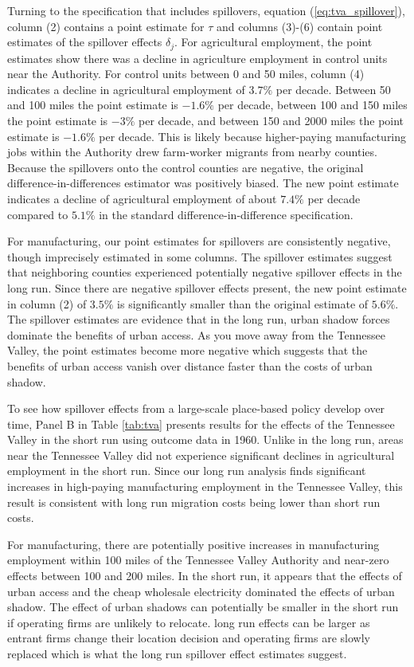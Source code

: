 \documentclass[11pt]{article}
\begin{document}
Turning to the specification that includes spillovers, equation (\ref{eq:tva_spillover}), column (2) contains a point estimate for $\tau$ and columns (3)-(6) contain point estimates of the spillover effects $\delta_j$. For agricultural employment, the point estimates show there was a decline in agriculture employment in control units near the Authority. For control units between 0 and 50 miles, column (4) indicates a decline in agricultural employment of $3.7\%$ per decade. Between 50 and 100 miles the point estimate is $-1.6\%$ per decade, between 100 and 150 miles the point estimate is $-3\%$ per decade, and between 150 and 2000 miles the point estimate is $-1.6\%$ per decade. This is likely because higher-paying manufacturing jobs within the Authority drew farm-worker migrants from nearby counties. Because the spillovers onto the control counties are negative, the original difference-in-differences estimator was positively biased. The new point estimate indicates a decline of agricultural employment of about $7.4\%$ per decade compared to $5.1\%$ in the standard difference-in-difference specification. 

For manufacturing, our point estimates for spillovers are consistently negative, though imprecisely estimated in some columns. The spillover estimates suggest that neighboring counties experienced potentially negative spillover effects in the long run. Since there are negative spillover effects present, the new point estimate in column (2) of $3.5\%$ is significantly smaller than the original estimate of $5.6\%$. The spillover estimates are evidence that in the long run, urban shadow forces dominate the benefits of urban access. As you move away from the Tennessee Valley, the point estimates become more negative which suggests that the benefits of urban access vanish over distance faster than the costs of urban shadow.

To see how spillover effects from a large-scale place-based policy develop over time, Panel B in Table \ref{tab:tva} presents results for the effects of the Tennessee Valley in the short run using outcome data in 1960. Unlike in the long run, areas near the Tennessee Valley did not experience significant declines in agricultural employment in the short run. Since our long run analysis finds significant increases in high-paying manufacturing employment in the Tennessee Valley, this result is consistent with long run migration costs being lower than short run costs.

For manufacturing, there are potentially positive increases in manufacturing employment within 100 miles of the Tennessee Valley Authority and near-zero effects between 100 and 200 miles. In the short run, it appears that the effects of urban access and the cheap wholesale electricity dominated the effects of urban shadow. The effect of urban shadows can potentially be smaller in the short run if operating firms are unlikely to relocate. long run effects can be larger as entrant firms change their location decision and operating firms are slowly replaced which is what the long run spillover effect estimates suggest.
\end{document}
